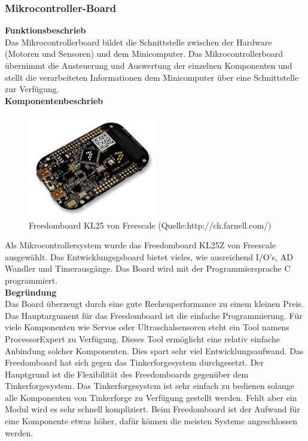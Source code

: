 \subsubsection{Mikrocontroller-Board}
\textbf{Funktionsbeschrieb}\\[0.2cm]
Das Mikrocontrollerboard bildet die Schnittstelle zwischen der Hardware (Motoren und Sensoren) und dem Minicomputer. Das Mikrocontrollerboard übernimmt die Ansteuerung und Auswertung der einzelnen Komponenten und stellt die verarbeiteten Informationen dem Minicomputer über eine Schnittstelle zur Verfügung. \\[0.2cm]
\textbf{Komponentenbeschrieb}\\[0.2cm]
\begin{figure}[H]
	\centering
	\includegraphics[width=0.5\textwidth]{03_Loesungskonzept/pictures/freedomboard.png}
	\caption{Freedomboard KL25 von Freescale (Quelle:http://ch.farnell.com/)}
\end{figure}\flushleft
Als Mikrocontrollersystem wurde das Freedomboard KL25Z von Freescale ausgewählt. Das Entwicklungsgsboard bietet vieles, wie ausreichend I/O's, AD Wandler und Timerausgänge. Das Board wird mit der Programmiersprache C programmiert. \\[0.2cm]
\textbf{Begründung}\\[0.2cm]
Das Board überzeugt durch eine gute Rechenperformance zu einem kleinen Preis. Das Hauptargument für das Freedomboard ist die einfache Programmierung. Für viele Komponenten wie Servos oder Ultraschalsensoren steht ein Tool namens ProcessorExpert zu Verfügung. Dieses Tool ermöglicht eine relativ einfache Anbindung solcher Komponenten. Dies spart sehr viel Entwicklungsaufwand.
Das Freedomboard hat sich gegen das Tinkerforgesystem durchgesetzt. Der Hauptgrund ist die Flexibilität des Freedomboards gegenüber dem Tinkerforgesystem. Das Tinkerforgesystem ist sehr einfach zu bedienen solange alle Komponenten von Tinkerforge zu Verfügung gestellt werden. Fehlt aber ein Modul wird es sehr schnell kompliziert. Beim Freedomboard ist der Aufwand für eine Komponente etwas höher, dafür können die meisten Systeme angeschlossen werden.\\[0.2cm]
